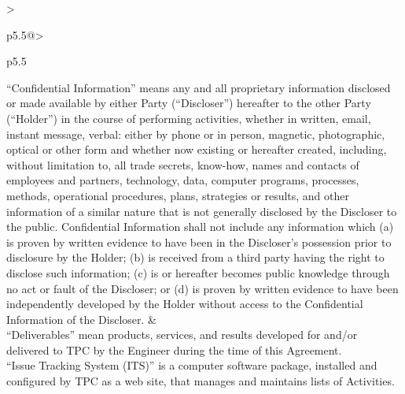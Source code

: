 \documentclass[10pt,letterpaper,oneside,twocolumn]{article}
\newcommand{\M}[1]{\vspace*{0pt}{\color{blue!50!black}\raggedright #1}}
\renewcommand{\M}[1]{}
\begin{document}
\begin{mpxtabular}{>{\raggedright\arraybackslash }p{5.5\TPHorizModule}@{\hspace{\TPHorizModule}}>{\raggedright\normalfont\selectfont\arraybackslash}p{5.5\TPHorizModule}}
        ``Confidential Information'' means any and all
        proprietary information disclosed or made available by
        either Party (``Discloser'') hereafter to the other Party (``Holder'') in the course of performing
        activities, whether in written, email, instant message,
        verbal: either by phone or in person, magnetic, photographic,
        optical or other form and whether now existing or hereafter
        created, including, without limitation to, all trade secrets,
        know-how, names and contacts of employees and partners,
        technology, data, computer programs, processes, methods,
        operational procedures, plans, strategies or results, and other
        information of a similar nature that is not generally disclosed
        by the Discloser to the public.
        Confidential Information shall not include any information which
            (a) is proven by written evidence to have been in the Discloser's possession prior to disclosure by the Holder;
            (b) is received from a third party having the right to disclose such information;
            (c) is or hereafter becomes public knowledge through no act or fault of the Discloser; or
            (d) is proven by written evidence to have been independently developed by the Holder without access to the Confidential Information of the Discloser. &
            \M{This definition is very wide, but it covers all possible examples of confidential information, e.g.:
                \begin{itemize}
                \item contact details of TPC's customer,
                \item software code,
                \item ideas and principles of management
                \end{itemize}
            You should be careful with any information you receive during
            your work with TPC. The best approach is to \textbf{not} disclose anything to anyone.} \\

        ``Deliverables'' mean products, services, and results developed
        for and/or delivered to TPC by the Engineer
        during the time of this Agreement. \\

        ``Issue Tracking System (ITS)'' is a computer software package,
        installed and configured by TPC as a web site,
        that manages and maintains lists of Activities. \\


\end{mpxtabular}
\end{document}

